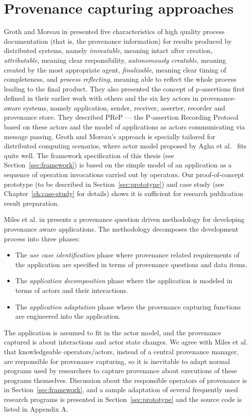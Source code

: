 \section{Provenance capturing approaches}
Groth and Moreau in \cite{groth2009recording} presented five characteristics of high quality process documentation (that is, the provenance information) for results produced by distributed systems, namely \emph{immutable}, meaning intact after creation, \emph{attributable}, meaning clear responsibility, \emph{autonomously creatable}, meaning created by the most appropriate agent, \emph{finalizable}, meaning clear timing of completeness, and \emph{process reflecting}, meaning able to reflect the whole process leading to the final product. They also presented the concept of p-assertions first defined in their earlier work with others \cite{groth2006architecture} and the six key actors in provenance-aware systems, namely application, sender, receiver, asserter, recorder and provenance store. They described PReP --- the P-assertion Recording Protocol based on these actors and the model of applications as actors communicating via message passing. Groth and Moreau's approach is specially tailored for distributed computing scenarios, where actor model proposed by Agha et al.~\cite{agha1985actors,agha1997foundation} fits quite well. The framework specification of this thesis (see Section~\ref{sec:framework}) is based on the simple model of an application as a sequence of operation invocations carried out by operators. Our proof-of-concept prototype (to be described in Section~\ref{sec:prototype}) and case study (see Chapter~\ref{ch:case-study} for details) shows it is sufficient for research publication result preparation.

Miles et al. in \cite{miles2011prime} presents a provenance question driven methodology for developing provenance aware applications. The methodology decomposes the development process into three phases:
\begin{itemize}
	\item The \emph{use case identification} phase where provenance related requirements of the application are specified in terms of provenance questions and data items.
	\item The \emph{application decomposition} phase where the application is modeled in terms of actors and their interactions.
	\item The \emph{application adaptation} phase where the provenance capturing functions are engineered into the application.
\end{itemize}
The application is assumed to fit in the actor model, and the provenance captured is about interactions and actor state changes. We agree with Miles et al. that knowledgeable operators/actors, instead of a central provenance manager, are responsible for provenance capturing, so it is inevitable to adapt normal programs used by researchers to capture provenance about executions of these programs themselves. Discussion about the responsible operators of provenance is in Section~\ref{sec:framework}, and a sample adaptation of several frequently used research programs is presented in Section~\ref{sec:prototype} and the source code is listed in Appendix A.

